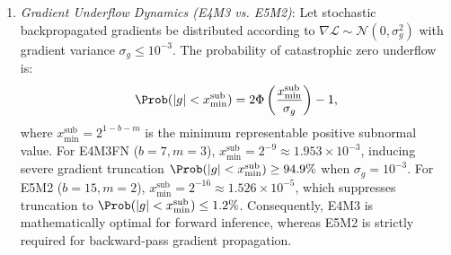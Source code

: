 \begin{theorem}
\begin{enumerate}
    \begin{equation}
    \|\mat{A} \mat{B} - \widehat{\mat{A}} \widehat{\mat{B}}\|_F \le \frac{2^{-m}}{\sqrt{3}} \sqrt{K} \|\mat{A}\|_F \|\mat{B}\|_F + \frac{2^{-2m}}{12} \sqrt{K} \|\mat{A}\|_F \|\mat{B}\|_F.
    \label{eq:fp8_gemm_frobenius_bound}
    \end{equation}
    \item \emph{Gradient Underflow Dynamics (E4M3 vs. E5M2)}: Let stochastic backpropagated gradients be distributed according to $\nabla \mathcal{L} \sim \mathcal{N}(0, \sigma_g^2)$ with gradient variance $\sigma_g \le 10^{-3}$.
    The probability of catastrophic zero underflow is:
    \begin{equation}
    \Prob(|g| < x_{\min}^{\text{sub}}) = 2 \Phi\left( \frac{x_{\min}^{\text{sub}}}{\sigma_g} \right) - 1,
    \label{eq:underflow_prob_def}
    \end{equation}
    where $x_{\min}^{\text{sub}} = 2^{1 - b - m}$ is the minimum representable positive subnormal value.
    For E4M3FN ($b=7, m=3$), $x_{\min}^{\text{sub}} = 2^{-9} \approx 1.953 \times 10^{-3}$, inducing severe gradient truncation $\Prob(|g| < x_{\min}^{\text{sub}}) \ge 94.9\%$ when $\sigma_g = 10^{-3}$.
    For E5M2 ($b=15, m=2$), $x_{\min}^{\text{sub}} = 2^{-16} \approx 1.526 \times 10^{-5}$, which suppresses truncation to $\Prob(|g| < x_{\min}^{\text{sub}}) \le 1.2\%$.
    Consequently, E4M3 is mathematically optimal for forward inference, whereas E5M2 is strictly required for backward-pass gradient propagation.
\end{enumerate}
\end{theorem}

